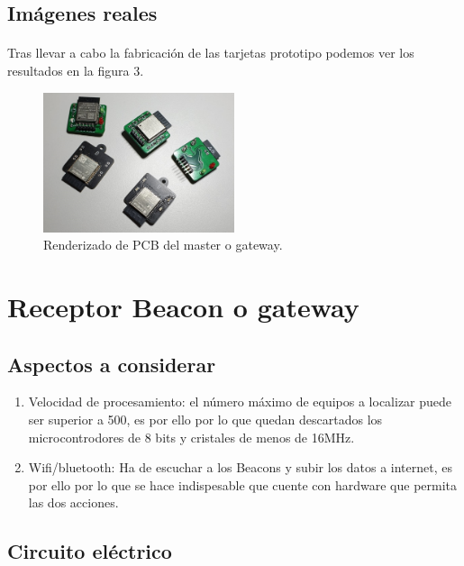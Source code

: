\documentclass[paper=a4, fontsize=11pt,twoside]{scrartcl}	%
\begin{document}
    \subsection{Imágenes reales}
        \paragraph{}
        Tras llevar a cabo la fabricación de las tarjetas prototipo podemos ver los resultados en la figura 3.
        \begin{center}
            \begin{figure}[ht]
                \centering
                \includegraphics[width=0.5\textwidth]{../real_beacon_pcb.jpeg}
                \caption{Renderizado de PCB del master o gateway.}
                \label{fig:mesh3}
            \end{figure}    
        \end{center}       
\section{Receptor Beacon o gateway}
    \subsection{Aspectos a considerar}
        \begin{enumerate}
            \item Velocidad de procesamiento: el número máximo de equipos a localizar puede ser superior a 500, es por ello 
            por lo que quedan descartados los microcontrodores de 8 bits y cristales de menos de 16MHz.
            \item Wifi/bluetooth: Ha de escuchar a los Beacons y subir los datos a internet, es por ello por lo que se hace 
            indispesable que cuente con hardware que permita las dos acciones.
        \end{enumerate}

    \subsection{Circuito eléctrico}
\end{document}
